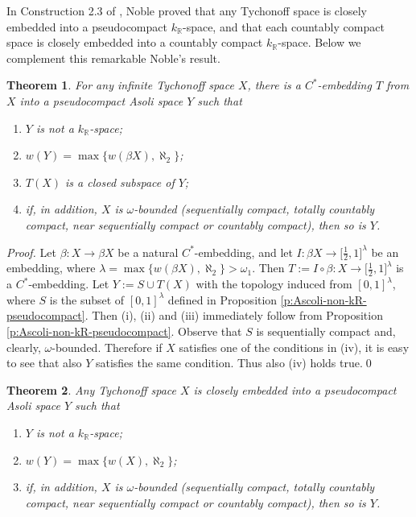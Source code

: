 \documentclass[preprint,11pt]{elsarticle}
\newtheorem{theorem}{Theorem}[section]
\numberwithin{equation}{section}
\numberwithin{theorem}{section}
\newcommand{\w}{\omega}
\newcommand{\IR}{\mathbb{R}}
\begin{document}
In Construction 2.3 of \cite{Noble-cc}, Noble proved that any Tychonoff space is closely embedded into a pseudocompact $k_\IR$-space, and that each countably compact space is closely embedded into a countably compact $k_\IR$-space. Below we complement this remarkable Noble's result.

\begin{theorem} \label{t:Tych-embed-ps-Ascoli}
For any infinite Tychonoff space $X$, there is a $C^\ast$-embedding $T$ from $X$ into a pseudocompact Asoli space $Y$ such that
\begin{enumerate}
\item[{\rm(i)}] $Y$ is not a $k_\IR$-space;
\item[{\rm(ii)}] $w(Y)= \max\{w(\beta X), \aleph_2\}$;
\item[{\rm(iii)}] $T(X)$ is a closed subspace of $Y$;
\item[{\rm(iv)}] if, in addition, $X$ is $\w$-bounded (sequentially compact, totally countably compact, near sequentially compact or countably compact), then so is $Y$.
\end{enumerate}
\end{theorem}

\begin{proof}
Let $\beta:X\to \beta X$ be a natural $C^\ast$-embedding, and let $I:\beta X\to \big[\tfrac{1}{2},1\big]^\lambda$ be an embedding, where $\lambda=\max\{w(\beta X), \aleph_2\}>\w_1$. Then $T:=I\circ\beta:X\to  \big[\tfrac{1}{2},1\big]^\lambda$ is a $C^\ast$-embedding. Let $Y:=S\cup T(X)$ with the topology induced from $[0,1]^\lambda$, where  $S$ is the subset of $[0,1]^\lambda$ defined in Proposition \ref{p:Ascoli-non-kR-pseudocompact}. Then (i), (ii) and (iii) immediately follow from Proposition \ref{p:Ascoli-non-kR-pseudocompact}. Observe that  $S$ is  sequentially compact and, clearly, $\w$-bounded. Therefore if $X$ satisfies one of the conditions in (iv), it is easy to see that also $Y$ satisfies the same condition. Thus also (iv) holds true.\qed
\end{proof}


\begin{theorem} \label{t:Tych-embed-ps-Ascoli-2}
Any Tychonoff space $X$ is closely embedded into a pseudocompact Asoli space $Y$ such that
\begin{enumerate}
\item[{\rm(i)}] $Y$ is not a $k_\IR$-space;
\item[{\rm(ii)}] $w(Y)= \max\{w(X), \aleph_2\}$;
\item[{\rm(iii)}] if, in addition, $X$ is $\w$-bounded (sequentially compact, totally countably compact, near sequentially compact or countably compact), then so is $Y$.
\end{enumerate}
\end{theorem}
\end{document}
